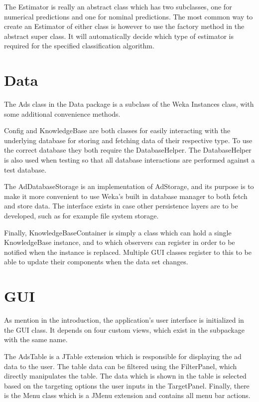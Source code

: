 \documentclass[11pt,twoside,a4paper]{article}
\begin{document}
The Estimator is really an abstract class which has two subclasses, one for numerical predictions and one for nominal predictions. The most common way to create an Estimator of either class is however to use the factory method in the abstract super class. It will automatically decide which type of estimator is required for the specified classification algorithm.

\section{Data}
The Ads class in the Data package is a subclass of the Weka Instances class, with some additional convenience methods.

Config and KnowledgeBase are both classes for easily interacting with the underlying database for storing and fetching data of their respective type. To use the correct database they both require the DatabaseHelper. The DatabaseHelper is also used when testing so that all database interactions are performed against a test database.

The AdDatabaseStorage is an implementation of AdStorage, and its purpose is to make it more convenient to use Weka's built in database manager to both fetch and store data. The interface exists in case other persistence layers are to be developed, such as for example file system storage.

Finally, KnowledgeBaseContainer is simply a class which can hold a single KnowledgeBase instance, and to which observers can register in order to be notified when the instance is replaced. Multiple GUI classes register to this to be able to update their components when the data set changes.

\section{GUI}
As mention in the introduction, the application's user interface is initialized in the GUI class. It depends on four custom views, which exist in the subpackage with the same name.

The AdsTable is a JTable extension which is responsible for displaying the ad data to the user. The table data can be filtered using the FilterPanel, which directly manipulates the table. The data which is shown in the table is selected based on the targeting options the user inputs in the TargetPanel. Finally, there is the Menu class which is a JMenu extension and contains all menu bar actions.
\end{document}

